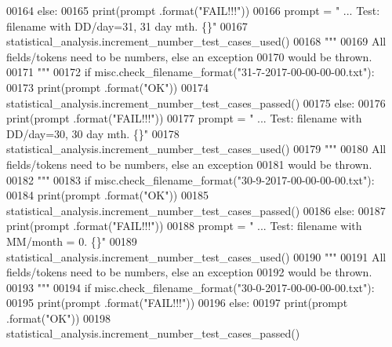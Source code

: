 \begin{DoxyCode}
00164         \textcolor{keywordflow}{else}:
00165             print(prompt .format(\textcolor{stringliteral}{"FAIL!!!"}))
00166         prompt = \textcolor{stringliteral}{"  ... Test: filename with DD/day=31, 31 day mth.      \{\}"}
00167         statistical\_analysis.increment\_number\_test\_cases\_used()
00168         \textcolor{stringliteral}{"""}
00169 \textcolor{stringliteral}{            All fields/tokens need to be numbers, else an exception}
00170 \textcolor{stringliteral}{                would be thrown.}
00171 \textcolor{stringliteral}{        """}
00172         \textcolor{keywordflow}{if} misc.check\_filename\_format(\textcolor{stringliteral}{"31-7-2017-00-00-00-00.txt"}):
00173             print(prompt .format(\textcolor{stringliteral}{"OK"}))
00174             statistical\_analysis.increment\_number\_test\_cases\_passed()
00175         \textcolor{keywordflow}{else}:
00176             print(prompt .format(\textcolor{stringliteral}{"FAIL!!!"}))
00177         prompt = \textcolor{stringliteral}{"  ... Test: filename with DD/day=30, 30 day mth.      \{\}"}
00178         statistical\_analysis.increment\_number\_test\_cases\_used()
00179         \textcolor{stringliteral}{"""}
00180 \textcolor{stringliteral}{            All fields/tokens need to be numbers, else an exception}
00181 \textcolor{stringliteral}{                would be thrown.}
00182 \textcolor{stringliteral}{        """}
00183         \textcolor{keywordflow}{if} misc.check\_filename\_format(\textcolor{stringliteral}{"30-9-2017-00-00-00-00.txt"}):
00184             print(prompt .format(\textcolor{stringliteral}{"OK"}))
00185             statistical\_analysis.increment\_number\_test\_cases\_passed()
00186         \textcolor{keywordflow}{else}:
00187             print(prompt .format(\textcolor{stringliteral}{"FAIL!!!"}))
00188         prompt = \textcolor{stringliteral}{"  ... Test: filename with MM/month = 0.           \{\}"}
00189         statistical\_analysis.increment\_number\_test\_cases\_used()
00190         \textcolor{stringliteral}{"""}
00191 \textcolor{stringliteral}{            All fields/tokens need to be numbers, else an exception}
00192 \textcolor{stringliteral}{                would be thrown.}
00193 \textcolor{stringliteral}{        """}
00194         \textcolor{keywordflow}{if} misc.check\_filename\_format(\textcolor{stringliteral}{"30-0-2017-00-00-00-00.txt"}):
00195             print(prompt .format(\textcolor{stringliteral}{"FAIL!!!"}))
00196         \textcolor{keywordflow}{else}:
00197             print(prompt .format(\textcolor{stringliteral}{"OK"}))
00198             statistical\_analysis.increment\_number\_test\_cases\_passed()

\end{DoxyCode}
